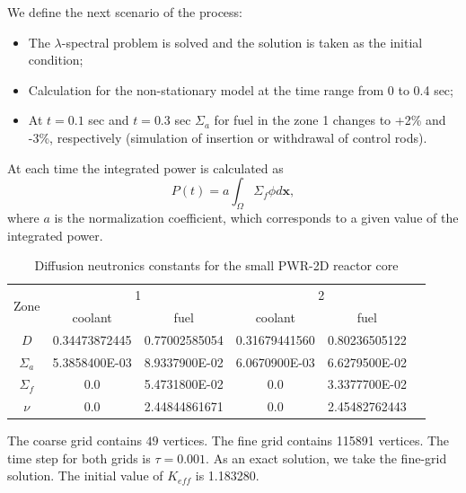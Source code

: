 \documentclass[10pt]{article}
\begin{document}
We define the next scenario of the process:
\begin{itemize}
\item The $\lambda$-spectral problem is solved and the solution is taken as the initial condition;
\item Calculation for the non-stationary model at the time range from 0 to 0.4 sec;
\item At $t=0.1$ sec and $t=0.3$ sec $\Sigma_a$ for fuel in the zone 1 changes to +2\% and -3\%, respectively (simulation of insertion or withdrawal of control rods).
\end{itemize}
At each time the integrated power is calculated as
\[P(t) = a\int_{\Omega}\Sigma_f \phi d\bm x,\]
where $a$ is the normalization coefficient, which corresponds to a given value of the integrated power.

\begin{table}[h]
\caption{Diffusion neutronics constants for the small PWR-2D reactor core}
\label{t1}
\begin{center}
\begin{tabular}{|c|c|c|c|c|c|}
\hline
\multirow{2}{*}{Zone} & \multicolumn{2}{c|}{1} & \multicolumn{2}{c|}{2} \\
\cline{2-5}
& coolant & fuel & coolant & fuel \\
\hline
$D$ & 0.34473872445 & 0.77002585054 & 0.31679441560 & 0.80236505122 \\
$\Sigma_a$ & 5.3858400E-03 & 8.9337900E-02 & 6.0670900E-03 & 6.6279500E-02 \\
$\Sigma_{f}$ & 0.0 & 5.4731800E-02 & 0.0 & 3.3377700E-02 \\
$\nu$ & 0.0 & 2.44844861671 & 0.0 & 2.45482762443 \\
\hline
\end{tabular}
\end{center}
\end{table}

The coarse grid contains $49$ vertices.
The fine grid contains 115891 vertices. 
The time step for both grids is $\tau = 0.001$.
As an exact solution, we take the fine-grid solution.
The initial value of $K_{eff}$ is 1.183280. 
\end{document}
